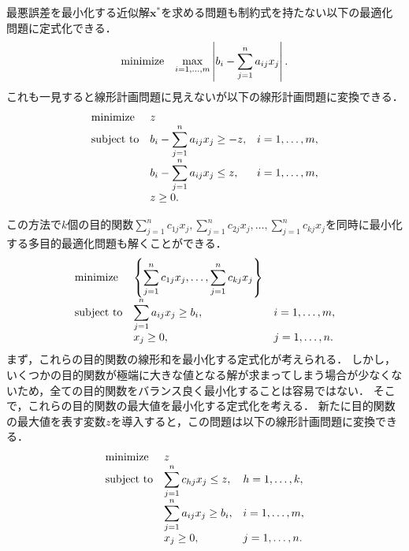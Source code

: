 \documentclass[japanese]{jnlp_1.4}
\begin{document}
最悪誤差を最小化する近似解$\bm{x}^{\ast}$を求める問題も制約式を持たない以下の最適化問題に定式化できる．
\begin{equation}
\begin{array}{ll}
\textnormal{minimize} & \displaystyle\max_{i=1,\dots,m} \left| b_i - \sum_{j=1}^n a_{ij} x_j \right|.
\end{array}
\end{equation}
これも一見すると線形計画問題に見えないが以下の線形計画問題に変換できる．
\begin{equation}
\begin{array}{lll}
\textnormal{minimize} & z & \\
\textnormal{subject to} & b_i - \displaystyle\sum_{j=1}^n a_{ij} x_j \ge -z, & i=1,\dots,m,\\
 & b_i - \displaystyle\sum_{j=1}^n a_{ij} x_j \le z, & i=1,\dots,m,\\
 & z \ge 0. &
\end{array}
\end{equation}

この方法で$k$個の目的関数$\sum_{j=1}^n c_{1j} x_j, \allowbreak \sum_{j=1}^n c_{2j} x_j, \allowbreak \dots, \allowbreak \sum_{j=1}^n c_{kj} x_j$を同時に最小化する多目的最適化問題も解くことができる．
\begin{equation}
\begin{array}{lll}
\textnormal{minimize} & \displaystyle \left\{ \sum_{j=1}^n c_{1j} x_j, \dots, \sum_{j=1}^n c_{kj} x_j \right\} & \\
\textnormal{subject to} & \displaystyle\sum_{j=1}^n a_{ij} x_j \ge b_i, & i=1,\dots,m,\\
 & x_j \ge 0, & j=1,\dots,n.
\end{array}
\end{equation}
まず，これらの目的関数の線形和を最小化する定式化が考えられる．
しかし，いくつかの目的関数が極端に大きな値となる解が求まってしまう場合が少なくないため，全ての目的関数をバランス良く最小化することは容易ではない．
そこで，これらの目的関数の最大値を最小化する定式化を考える．
新たに目的関数の最大値を表す変数$z$を導入すると，この問題は以下の線形計画問題に変換できる．
\pagebreak
\begin{equation}
\begin{array}{lll}
\textnormal{minimize} & z & \\
\textnormal{subject to} & \displaystyle\sum_{j=1}^n c_{hj} x_j \le z, & h=1,\dots,k,\\
 & \displaystyle\sum_{j=1}^n a_{ij} x_j \ge b_i, & i=1,\dots,m,\\
 & x_j \ge 0, & j=1,\dots,n.
\end{array}
\end{equation}
\end{document}
